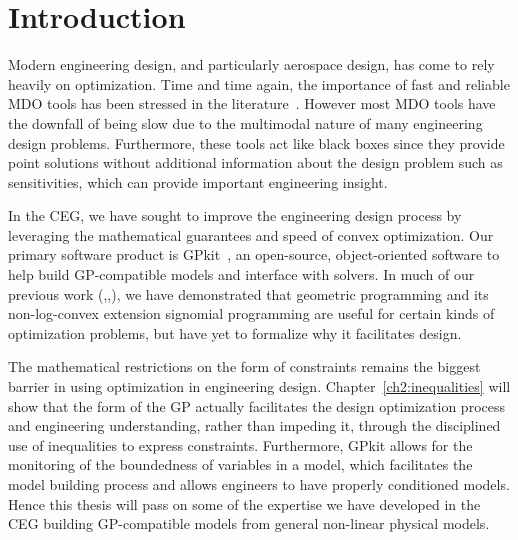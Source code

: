 \chapter{Introduction}
\label{ch1_intro}

Modern engineering design, and particularly aerospace design, has come to rely
heavily on optimization. Time and time again, the importance of fast and
reliable \gls{MDO} tools has been stressed in the literature~\cite{martins_mdo}.
However most \gls{MDO} tools
have the downfall of being slow due to the multimodal nature of many
engineering design problems. Furthermore, these tools act like black boxes since
they provide point solutions without additional information about the design problem
such as sensitivities, which can provide important engineering insight.


In the \gls{CEG}, we have sought to improve the engineering design process by
leveraging the mathematical guarantees and speed of convex optimization.
Our primary software product is GPkit~\cite{gpkit}, an
open-source, object-oriented software to help build \gls{GP}-compatible models and
interface with solvers. In much of our previous work
(\cite{gp_ac_design},\cite{sp_ac_design},\cite{sp_engine}), we have demonstrated that
geometric programming and its non-log-convex extension signomial programming
are useful for certain kinds of
optimization problems, but have yet to formalize why it
facilitates design.

The mathematical restrictions on the form of constraints remains the biggest
barrier in using optimization in engineering design. Chapter~\ref{ch2:inequalities} will
show that the form of the \gls{GP} actually facilitates the design
optimization process
and engineering understanding, rather than impeding it, through the disciplined use
of inequalities to express constraints.
Furthermore, GPkit allows for the
monitoring of the boundedness of variables in a model, which facilitates the model
building process and allows engineers
to have properly conditioned models. Hence this thesis will
pass on some of the expertise we have developed in the \gls{CEG} building
\gls{GP}-compatible models from general non-linear physical models.

